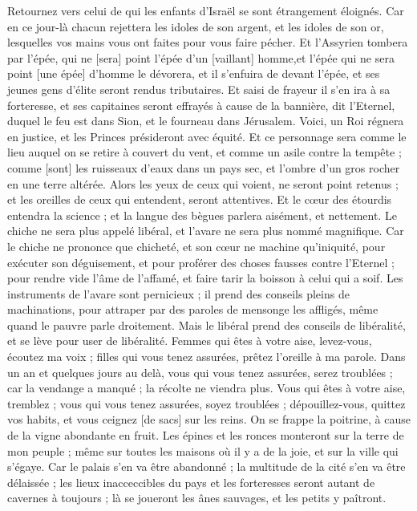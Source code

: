 \begin{multicols}{2}
Retournez vers celui de qui les enfants d'Israël se sont étrangement éloignés.
Car en ce jour-là chacun rejettera les idoles de son argent, et les idoles de son or, lesquelles vos mains vous ont faites pour vous faire pécher.
Et l'Assyrien tombera par l'épée, qui ne [sera] point l'épée d'un [vaillant] homme,et l'épée qui ne sera point [une épée] d'homme le dévorera, et il s'enfuira de devant l'épée, et ses jeunes gens d'élite seront rendus tributaires.
Et saisi de frayeur il s'en ira à sa forteresse, et ses capitaines seront effrayés à cause de la bannière, dit l'Eternel, duquel le feu est dans Sion, et le fourneau dans Jérusalem.
\VerseOne{}Voici, un Roi régnera en justice, et les Princes présideront avec équité.
Et ce personnage sera comme le lieu auquel on se retire à couvert du vent, et comme un asile contre la tempête ; comme [sont] les ruisseaux d'eaux dans un pays sec, et l'ombre d'un gros rocher en une terre altérée.
Alors les yeux de ceux qui voient, ne seront point retenus ; et les oreilles de ceux qui entendent, seront attentives.
Et le cœur des étourdis entendra la science ; et la langue des bègues parlera aisément, et nettement.
Le chiche ne sera plus appelé libéral, et l'avare ne sera plus nommé magnifique.
Car le chiche ne prononce que chicheté, et son cœur ne machine qu'iniquité, pour exécuter son déguisement, et pour proférer des choses fausses contre l'Eternel ; pour rendre vide l'âme de l'affamé, et faire tarir la boisson à celui qui a soif.
Les instruments de l'avare sont pernicieux ; il prend des conseils pleins de machinations, pour attraper par des paroles de mensonge les affligés, même quand le pauvre parle droitement.
Mais le libéral prend des conseils de libéralité, et se lève pour user de libéralité.
Femmes qui êtes à votre aise, levez-vous, écoutez ma voix ; filles qui vous tenez assurées, prêtez l'oreille à ma parole.
Dans un an et quelques jours au delà, vous qui vous tenez assurées, serez troublées ; car la vendange a manqué ; la récolte ne viendra plus.
Vous qui êtes à votre aise, tremblez ; vous qui vous tenez assurées, soyez troublées ; dépouillez-vous, quittez vos habits, et vous ceignez [de sacs] sur les reins.
On se frappe la poitrine, à cause de la vigne abondante en fruit.
Les épines et les ronces monteront sur la terre de mon peuple ; même sur toutes les maisons où il y a de la joie, et sur la ville qui s'égaye.
Car le palais s'en va être abandonné ; la multitude de la cité s'en va être délaissée ; les lieux inacceccibles du pays et les forteresses seront autant de cavernes à toujours ; là se joueront les ânes sauvages, et les petits y paîtront.

\end{multicols}
